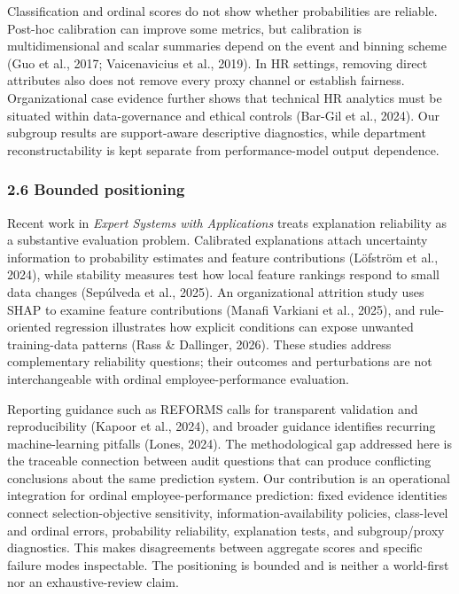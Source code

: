 \documentclass[
  a4paper,
  review]{elsarticle}
\begin{document}
Classification and ordinal scores do not show whether probabilities are
reliable. Post-hoc calibration can improve some metrics, but calibration
is multidimensional and scalar summaries depend on the event and binning
scheme (Guo et al., 2017; Vaicenavicius et al., 2019). In HR settings,
removing direct attributes also does not remove every proxy channel or
establish fairness. Organizational case evidence further shows that
technical HR analytics must be situated within data-governance and
ethical controls (Bar-Gil et al., 2024). Our subgroup results are
support-aware descriptive diagnostics, while department
reconstructability is kept separate from performance-model output
dependence.

\subsubsection{2.6 Bounded positioning}\label{bounded-positioning}

Recent work in \emph{Expert Systems with Applications} treats
explanation reliability as a substantive evaluation problem. Calibrated
explanations attach uncertainty information to probability estimates and
feature contributions (Löfström et al., 2024), while stability measures
test how local feature rankings respond to small data changes (Sepúlveda
et al., 2025). An organizational attrition study uses SHAP to examine
feature contributions (Manafi Varkiani et al., 2025), and rule-oriented
regression illustrates how explicit conditions can expose unwanted
training-data patterns (Rass \& Dallinger, 2026). These studies address
complementary reliability questions; their outcomes and perturbations
are not interchangeable with ordinal employee-performance evaluation.

Reporting guidance such as REFORMS calls for transparent validation and
reproducibility (Kapoor et al., 2024), and broader guidance identifies
recurring machine-learning pitfalls (Lones, 2024). The methodological
gap addressed here is the traceable connection between audit questions
that can produce conflicting conclusions about the same prediction
system. Our contribution is an operational integration for ordinal
employee-performance prediction: fixed evidence identities connect
selection-objective sensitivity, information-availability policies,
class-level and ordinal errors, probability reliability, explanation
tests, and subgroup/proxy diagnostics. This makes disagreements between
aggregate scores and specific failure modes inspectable. The positioning
is bounded and is neither a world-first nor an exhaustive-review claim.
\end{document}
